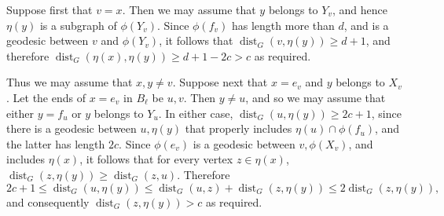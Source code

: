 \documentclass[titlepage,11pt]{article}
\newcommand{\dist}{\operatorname{dist}}
\begin{document}
	Suppose first that $v=x$.
	Then we may assume that $y$ belongs to $Y_v$, and hence $\eta(y)$ is a subgraph of $\phi(Y_v)$. Since $\phi(f_v)$ has length more than $d$, and is a geodesic between $v$ and $\phi(Y_v)$, it follows that $\dist_G(v,\eta(y))\ge d+1$, and therefore
	$\dist_G(\eta(x),\eta(y))\ge d+1-2c>c$ as required.
	
	Thus we may assume that $x,y\ne v$.
	Suppose next that $x=e_v$ and $y$ belongs to $X_v$. Let the ends of $x=e_v$ in $B_\ell$ be $u,v$.  Then $y\ne u$, and so we may
	assume that either $y=f_u$ or $y$ belongs to $Y_u$. In either case, $\dist_G(u, \eta(y))\ge 2c+1$, since there is a geodesic between
	$u,\eta(y)$ that properly includes $\eta(u)\cap \phi(f_u)$, and the latter has length $2c$.
	Since $\phi(e_v)$
	is a geodesic between $v,\phi(X_v)$, and includes $\eta(x)$, it follows that for every vertex $z\in \eta(x)$,
	$\dist_G(z,\eta(y))\ge \dist_G(z,u)$. Therefore
	$$2c+1\le \dist_G(u,\eta(y))\le \dist_G(u,z) + \dist_G(z,\eta(y))\le 2\dist_G(z,\eta(y)),$$
	and consequently $\dist_G(z,\eta(y))>c$ as required.
	
\end{document}
